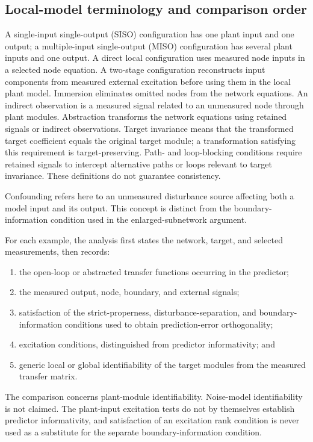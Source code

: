\documentclass[11pt,a4paper]{article}
\begin{document}
\subsection{Local-model terminology and comparison order}
\label{sec:comparison-protocol}

A single-input single-output (SISO) configuration has one plant input and one output; a multiple-input single-output (MISO) configuration has several plant inputs and one output.  A direct local configuration uses measured node inputs in a selected node equation.  A two-stage configuration reconstructs input components from measured external excitation before using them in the local plant model.  Immersion eliminates omitted nodes from the network equations.  An indirect observation is a measured signal related to an unmeasured node through plant modules.  Abstraction transforms the network equations using retained signals or indirect observations.  Target invariance means that the transformed target coefficient equals the original target module; a transformation satisfying this requirement is target-preserving.  Path- and loop-blocking conditions require retained signals to intercept alternative paths or loops relevant to target invariance.  These definitions do not guarantee consistency.

Confounding refers here to an unmeasured disturbance source affecting both a model input and its output.  This concept is distinct from the boundary-information condition used in the enlarged-subnetwork argument.

For each example, the analysis first states the network, target, and selected measurements, then records:
\begin{enumerate}
  \item the open-loop or abstracted transfer functions occurring in the predictor;
  \item the measured output, node, boundary, and external signals;
  \item satisfaction of the strict-properness, disturbance-separation, and boundary-information conditions used to obtain prediction-error orthogonality;
  \item excitation conditions, distinguished from predictor informativity; and
  \item generic local or global identifiability of the target modules from the measured transfer matrix.
\end{enumerate}
The comparison concerns plant-module identifiability.  Noise-model identifiability is not claimed.  The plant-input excitation tests do not by themselves establish predictor informativity, and satisfaction of an excitation rank condition is never used as a substitute for the separate boundary-information condition.
\end{document}
